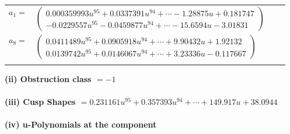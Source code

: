 \documentclass[1p]{elsarticle_modified}
\theoremstyle{definition}
\begin{document}
\begin{tabular}{m{7pt} m{180pt} m{7pt} m{180pt} }
\flushright $a_{1}=$&$\begin{pmatrix}0.000359993 u^{95}+0.0337391 u^{94}+\cdots-1.28875 u+0.181747\\-0.0229557 u^{95}-0.0459877 u^{94}+\cdots-15.6594 u-3.01831\end{pmatrix}$ \\
\flushright $a_{8}=$&$\begin{pmatrix}0.0411489 u^{95}+0.0905918 u^{94}+\cdots+9.90432 u+1.92132\\0.0139742 u^{95}+0.0146067 u^{94}+\cdots+3.23336 u-0.117667\end{pmatrix}$\\&\end{tabular}
\flushleft \textbf{(ii) Obstruction class $= -1$}\\~\\
\flushleft \textbf{(iii) Cusp Shapes $= 0.231161 u^{95}+0.357393 u^{94}+\cdots+149.917 u+38.0944$}\\~\\
\newpage\renewcommand{\arraystretch}{1}
\flushleft \textbf{(iv) u-Polynomials at the component}\newline \\
\end{document}
